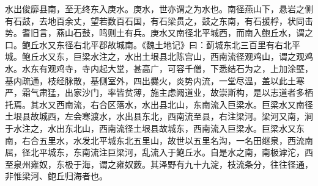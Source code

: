 \documentclass[12pt,UTF8]{ctexbook}
\begin{document}
水出俊靡县南，至无终东入庚水。庚水，世亦谓之为水也。南径燕山下，悬岩之侧有石鼓，去地百余丈，望若数百石国，有石梁贯之，鼓之东南，有石援桴，状同击势。耆旧言，燕山石鼓，鸣则土有兵。庚水又南径北平城西，而南入鲍丘水，谓之口。鲍丘水又东径右北平郡故城南。《魏土地记》曰：蓟城东北三百里有右北平城。鲍丘水又东，巨梁水注之，水出土垠县北陈宫山，西南流径观鸡山，谓之观鸡水。水东有观鸡寺，寺内起大堂，甚高广，可容千僧，下悉结石为之，上加涂塈，基内疏通，枝经脉散，基侧室外，四出爨火，炎势内流，一堂尽温，盖以此土寒严，霜气肃猛，出家沙门，率皆贫薄，施主虑阙道业，故崇斯构，是以志道者多栖托焉。其水又西南流，右合区落水，水出县北山，东南流入巨梁水。巨梁水又南径土垠县故城西，左会寒渡水，水出县东北，西南流至县，右注梁河。梁河又南，涧于水注之，水出东北山，西南流径土垠县故城东，西南流入巨梁水。巨梁水又东南，右合五里水，水发北平城东北五里山，故世以五里名沟，一名田继泉，西流南屈，径北平城东，东南流注巨梁河，乱流入于鲍丘水。自是水之南，南极滹沱，西至泉州雍奴，东极于海，谓之雍奴薮。其泽野有九十九淀，枝流条分，往往径通，非惟梁河、鲍丘归海者也。
\end{document}
